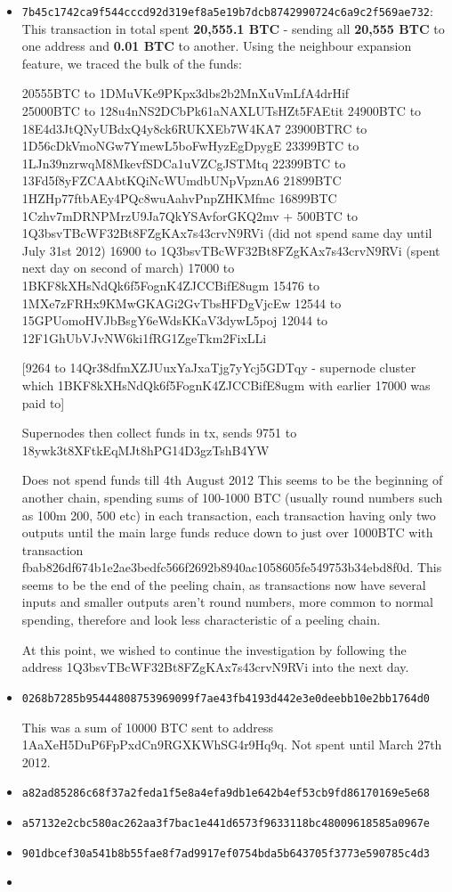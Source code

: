 \begin{itemize}
\item \texttt{7b45c1742ca9f544cccd92d319ef8a5e19b7dcb8742990724c6a9c2f569ae732}: This transaction in total spent \textbf{20,555.1 BTC} - sending all \textbf{20,555 BTC} to one address and \textbf{0.01 BTC} to another. Using the neighbour expansion feature, we traced the bulk of the funds: 

20555BTC to 1DMuVKe9PKpx3dbs2b2MnXuVmLfA4drHif\\
25000BTC to 128u4nNS2DCbPk61aNAXLUTsHZt5FAEtit
24900BTC to 18E4d3JtQNyUBdxQ4y8ck6RUKXEb7W4KA7
23900BTRC to 1D56cDkVmoNGw7YmewL5boFwHyzEgDpygE
23399BTC to 1LJn39nzrwqM8MkevfSDCa1uVZCgJSTMtq
22399BTC to 13Fd5f8yFZCAAbtKQiNcWUmdbUNpVpznA6
21899BTC 1HZHp77ftbAEy4PQc8wuAahvPnpZHKMfmc
16899BTC 1Czhv7mDRNPMrzU9Ja7QkYSAvforGKQ2mv + 500BTC to 1Q3bsvTBcWF32Bt8FZgKAx7s43crvN9RVi (did not spend same day until July 31st 2012)
16900 to 1Q3bsvTBcWF32Bt8FZgKAx7s43crvN9RVi (spent next day on second of march)
17000 to 1BKF8kXHsNdQk6f5FognK4ZJCCBifE8ugm
15476 to 1MXe7zFRHx9KMwGKAGi2GvTbsHFDgVjcEw
12544 to 15GPUomoHVJbBsgY6eWdsKKaV3dywL5poj
12044 to 12F1GhUbVJvNW6ki1fRG1ZgeTkm2FixLLi


[9264 to 14Qr38dfmXZJUuxYaJxaTjg7yYcj5GDTqy - supernode cluster which 1BKF8kXHsNdQk6f5FognK4ZJCCBifE8ugm with earlier 17000 was paid to]

Supernodes then collect funds in tx, sends 9751 to 18ywk3t8XFtkEqMJt8hPG14D3gzTshB4YW

Does not spend funds till 4th August 2012
This seems to be the beginning of another chain, spending sums of 100-1000 BTC (usually round numbers such as 100m 200, 500 etc) in each transaction, each transaction having only two outputs until the main large funds reduce down to just over 1000BTC with transaction fbab826df674b1e2ae3bedfc566f2692b8940ac1058605fe549753b34ebd8f0d. This seems to be the end of the peeling chain, as transactions now have several inputs and smaller outputs aren't round numbers, more common to normal spending, therefore and look less characteristic of a peeling chain. 


At this point, we wished to continue the investigation by following the address 1Q3bsvTBcWF32Bt8FZgKAx7s43crvN9RVi into the next day. 

\item \texttt{0268b7285b95444808753969099f7ae43fb4193d442e3e0deebb10e2bb1764d0}


This was a sum of 10000 BTC sent to address 1AaXeH5DuP6FpPxdCn9RGXKWhSG4r9Hq9q. Not spent until March 27th 2012.


\item \texttt{a82ad85286c68f37a2feda1f5e8a4efa9db1e642b4ef53cb9fd86170169e5e68}
\item \texttt{a57132e2cbc580ac262aa3f7bac1e441d6573f9633118bc48009618585a0967e}
\item \texttt{901dbcef30a541b8b55fae8f7ad9917ef0754bda5b643705f3773e590785c4d3}
\item 

\end{itemize}

